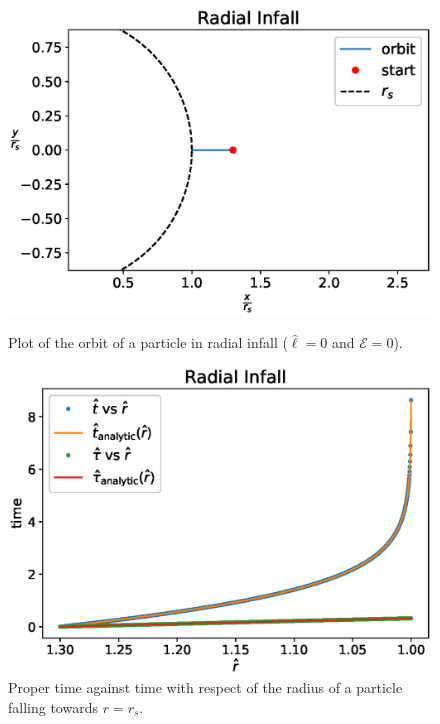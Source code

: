 \begin{figure}[h]
    \begin{minipage}{0.48\textwidth}
        \centering
        \includegraphics[width=\textwidth]{Figures/chapter2/radial_infall_plot.eps}
        \caption{Plot of the orbit of a particle in radial infall ($\hat \ell = 0$
        and $\mathcal E = 0$).}
    \end{minipage}
    \hspace{0.015 \textwidth}
    \begin{minipage}{0.48\textwidth}
        \centering
        \includegraphics[width=\textwidth]{Figures/chapter2/radial_infall.eps}
        \caption{Proper time against \Sh time with respect of the radius of a
        particle falling towards $r = r_s$.}
    \end{minipage}
\end{figure}

